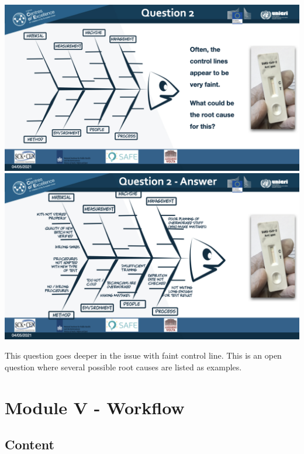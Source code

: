 \documentclass[
]{book}
\begin{document}
\includegraphics{images/m04/m04_questions_v3.003.jpeg}
\includegraphics{images/m04/m04_questions_v3.004.jpeg}

This question goes deeper in the issue with faint control line. This is an open question where several possible root causes are listed as examples.

\hypertarget{module-v---workflow}{%
\section{Module V - Workflow}\label{module-v---workflow}}

\hypertarget{content-3}{%
\subsection{Content}\label{content-3}}
\end{document}
